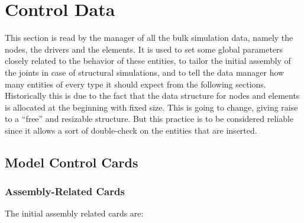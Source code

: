 %
%
%
%
%
% 
%
%

\chapter{Control Data}\label{sec:CONTROL-DATA}
This section is read by the manager of all the bulk simulation data, namely
the nodes, the drivers and the elements. It is used to set some global
parameters closely related to the behavior of these entities, to tailor the
initial assembly of the joints in case of structural simulations, and to
tell the data manager how many entities of every type it should expect from
the following sections. Historically this is due to the fact that the data
structure for nodes and elements is allocated at the beginning with fixed
size. This is going to change, giving raise to a ``free'' and resizable
structure. But this practice is to be considered reliable since it allows a
sort of double-check on the entities that are inserted.

\section{Model Control Cards}

\subsection{Assembly-Related Cards}
The initial assembly related cards are: 

